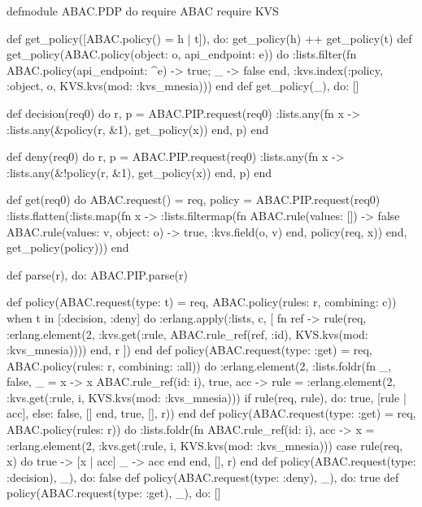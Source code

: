 \documentclass{article}
\let\originalfootnotesize\footnotesize
\let\oldverbatim\verbatim
\let\oldendverbatim\endverbatim
\renewenvironment{verbatim}{\originalfootnotesize\oldverbatim}{\oldendverbatim}
\begin{document}
\begingroup
\footnotesize
\begin{verbatim}
defmodule ABAC.PDP do
  require ABAC
  require KVS

  def get_policy([ABAC.policy() = h | t]), do: get_policy(h) ++ get_policy(t)
  def get_policy(ABAC.policy(object: o, api_endpoint: e)) do
    :lists.filter(fn ABAC.policy(api_endpoint: ^e) -> true; _ -> false end,
      :kvs.index(:policy, :object, o, KVS.kvs(mod: :kvs_mnesia)))
  end
  def get_policy(_), do: []

  def decision(req0) do
    {r, p} = ABAC.PIP.request(req0)
    :lists.any(fn x -> :lists.any(&policy(r, &1), get_policy(x)) end, p)
  end

  def deny(req0) do
    {r, p} = ABAC.PIP.request(req0)
    :lists.any(fn x -> :lists.any(&!policy(r, &1), get_policy(x)) end, p)
  end

  def get(req0) do
    {ABAC.request() = req, policy} = ABAC.PIP.request(req0)
    :lists.flatten(:lists.map(fn x ->
      :lists.filtermap(fn
        ABAC.rule(values: []) -> false
        ABAC.rule(values: v, object: o) -> {true, :kvs.field(o, v)}
      end, policy(req, x))
    end, get_policy(policy)))
  end

  def parse(r), do: ABAC.PIP.parse(r)

  def policy(ABAC.request(type: t) = req, ABAC.policy(rules: r, combining: c))
    when t in [:decision, :deny] do
    :erlang.apply(:lists, c, [
      fn ref -> rule(req, :erlang.element(2,
        :kvs.get(:rule, ABAC.rule_ref(ref, :id), KVS.kvs(mod: :kvs_mnesia)))) end,
      r
    ])
  end
  def policy(ABAC.request(type: :get) = req, ABAC.policy(rules: r,
    combining: :all)) do
    :erlang.element(2, :lists.foldr(fn
      _, {false, _} = x -> x
      ABAC.rule_ref(id: i), {true, acc} ->
        rule = :erlang.element(2, :kvs.get(:rule, i, KVS.kvs(mod: :kvs_mnesia)))
        if rule(req, rule), do: {true, [rule | acc]}, else: {false, []}
    end, {true, []}, r))
  end
  def policy(ABAC.request(type: :get) = req, ABAC.policy(rules: r)) do
    :lists.foldr(fn ABAC.rule_ref(id: i), acc ->
      x = :erlang.element(2, :kvs.get(:rule, i, KVS.kvs(mod: :kvs_mnesia)))
      case rule(req, x) do
        true -> [x | acc]
        _ -> acc
      end
    end, [], r)
  end
  def policy(ABAC.request(type: :decision), _), do: false
  def policy(ABAC.request(type: :deny), _), do: true
  def policy(ABAC.request(type: :get), _), do: []


\end{verbatim}
\end{document}
